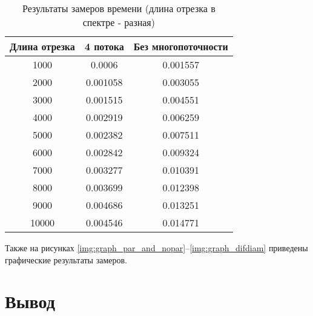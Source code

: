 \begin{table}[h]
    \begin{center}
        \begin{threeparttable}
        \captionsetup{justification=raggedright,singlelinecheck=off}
        \caption{Результаты замеров времени (длина отрезка в спектре - разная)}
        \label{tbl:time_mes_difdiam}
        \begin{tabular}{|c|c|c|}
            \hline
            Длина отрезка & 4 потока & Без многопоточности \\
            \hline
            1000 & 0.0006 & 0.001557 \\ \hline  
            2000 & 0.001058 & 0.003055 \\ \hline
            3000 & 0.001515 & 0.004551 \\ \hline
            4000 & 0.002919 & 0.006259 \\ \hline 
            5000 & 0.002382 & 0.007511 \\ \hline 
            6000 & 0.002842 & 0.009324 \\ \hline 
            7000 & 0.003277 & 0.010391 \\ \hline 
            8000 & 0.003699 & 0.012398 \\ \hline 
            9000 & 0.004686 & 0.013251 \\ \hline
            10000 & 0.004546 & 0.014771 \\ \hline  

		\end{tabular}
    \end{threeparttable}
\end{center}
\end{table}

\clearpage

Также на рисунках \ref{img:graph_par_and_nopar}--\ref{img:graph_difdiam} приведены графические результаты замеров.


\clearpage


\section{Вывод}

